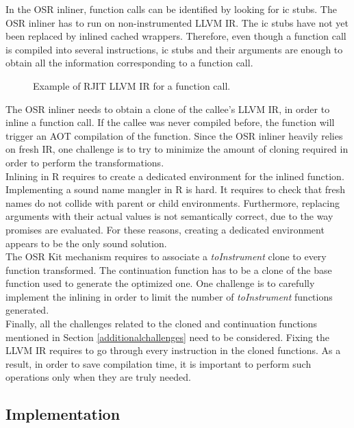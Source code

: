 In the OSR inliner, function calls can be identified by looking for ic stubs.
The OSR inliner has to run on non-instrumented LLVM IR. 
The ic stubs have not yet been replaced by inlined cached wrappers.
Therefore, even though a function call is compiled into several instructions, ic stubs and their arguments are enough to obtain all the information corresponding to a function call.\\

\begin{figure}[h]
\caption{Example of RJIT LLVM IR for a function call.}
\label{fig:functioncall}
\end{figure}


The OSR inliner needs to obtain a clone of the callee's LLVM IR, in order to inline a function call.
If the callee was never compiled before, the  function will trigger an AOT compilation of the function.
Since the OSR inliner heavily relies on fresh IR, one challenge is to try to minimize the amount of cloning required in order to perform the transformations.\\

Inlining in R requires to create a dedicated environment for the inlined function.
Implementing a sound name mangler in R is hard. 
It requires to check that fresh names do not collide with parent or child environments.
Furthermore, replacing arguments with their actual values is not semantically correct, due to the way promises are evaluated.
For these reasons, creating a dedicated environment appears to be the only sound solution.\\

The OSR Kit mechanism requires to associate a \textit{toInstrument} clone to every function transformed.
The continuation function has to be a clone of the base function used to generate the optimized one.
One challenge is to carefully implement the inlining in order to limit the number of \textit{toInstrument} functions generated.\\

Finally, all the challenges related to the cloned and continuation functions mentioned in Section \ref{additionalchallenges} need to be considered.
Fixing the LLVM IR requires to go through every instruction in the cloned functions.
As a result, in order to save compilation time, it is important to perform such operations only when they are truly needed.\\

\subsection{Implementation}

